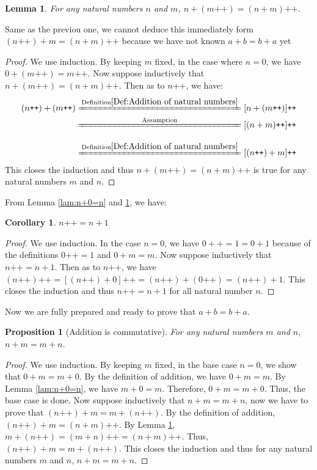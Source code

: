\documentclass[a4paper]{book}
\newtheorem*{proof}{\textit{Proof.}}
\newtheorem{corollary}{Corollary}[section]
\newtheorem{lemma}{Lemma}[section]
\newtheorem{proposition}{Proposition}[section]
\begin{document}
			\begin{lemma}
				\label{lam:n+(m++)=(n+m)++}
				For any natural numbers $n$ and $m$, $n+(m\texttt{++})=(n+m)\texttt{++}$.
			\end{lemma}
			Same as the previou one, we cannot deduce this immediately form $(n\texttt{++})+m=(n+m)\texttt{++}$ because we have not known $a+b=b+a$ yet 
			\begin{proof}
				We use induction. By keeping $m$ fixed, in the case where $n=0$, we have $0+(m\texttt{++})=m\texttt{++}$. Now suppose inductively that $n+(m\texttt{++})=(n+m)\texttt{++}$. Then as to $n\texttt{++}$, we have:
				\begin{align*}
				(n\texttt{++})+(m\texttt{++})&\xlongequal{\mathrm{Definition \ref{Def:Addition of natural numbers}}}[n+(m\texttt{++})]\texttt{++}\\
				&\xlongequal[\phantom{\mathrm{Definition \ref{Def:Addition of natural numbers}}}]{\mathrm{Assumption}}[(n+m)\texttt{++}]\texttt{++}\\
				&\xlongequal{\mathrm{Definition \ref{Def:Addition of natural numbers}}}[(n\texttt{++})+m]\texttt{++}
				\end{align*}
				This closes the induction and thus $n+(m\texttt{++})=(n+m)\texttt{++}$ is true for any natural numbers $m$ and $n$.
			\end{proof}
			From Lemma \ref{lam:n+0=n} and \ref{lam:n+(m++)=(n+m)++}, we have:
			\begin{corollary}
				\label{coro:n++=n+1}
				$n\texttt{++}=n+1$
			\end{corollary}
			\begin{proof}
				We use induction. In the case $n=0$, we have $0++=1=0+1$ because of the definitions $0\texttt{++}=1$ and $0+m=m$. Now suppose inductively that $n\texttt{++}=n+1$. Then as to $n\texttt{++}$, we have $(n\texttt{++})\texttt{++}=[(n\texttt{++})+0]\texttt{++}=(n\texttt{++})+(0\texttt{++})=(n\texttt{++})+1$. This closes the induction and thus $n\texttt{++}=n+1$ for all natural number $n$.
			\end{proof}
			Now we are fully prepared and ready to prove that $a+b=b+a$.
			\begin{proposition}[Addition is commutative]
				\label{pro:addition commutative}
				For any natural numbers $m$ and $n$, $n+m=m+n$.
			\end{proposition}
			\begin{proof}
				We use induction. By keeping $m$ fixed, in the base case $n=0$, we show that $0+m=m+0$. By the definition of addition, we have $0+m=m$. By Lemma \ref{lam:n+0=n}, we have $m+0=m$. Therefore, $0+m=m+0$. Thus, the base case is done. Now suppose inductively that $n+m=m+n$, now we have to prove that $(n\texttt{++})+m=m+(n\texttt{++})$. By the definition of addition, $(n\texttt{++})+m=(n+m)\texttt{++}$. By Lemma \ref{lam:n+(m++)=(n+m)++}, $m+(n\texttt{++})=(m+n)\texttt{++}=(n+m)\texttt{++}$. Thus, $(n\texttt{++})+m=m+(n\texttt{++})$. This closes the induction and thus for any natural numbers $m$ and $n$, $n+m=m+n$.
			\end{proof}
\end{document}
